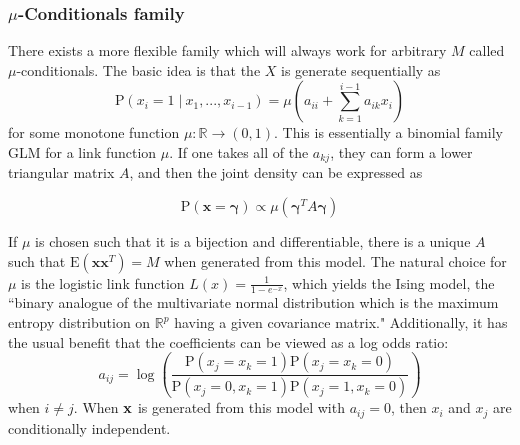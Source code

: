 \documentclass[11pt]{article}
\newcommand{\R}{\mathbb{R}}
\newcommand{\p}{\mathrm{P}}
\newcommand{\E}{\mathrm{E}}
\newcommand{\st}{ \; \big | \:}
\theoremstyle{definition}
\begin{document}
\subsubsection{$\mu$-Conditionals family}
    There exists a more flexible family which will always work for arbitrary $M$ called $\mu$-conditionals. The basic idea is that the $X$ is generate sequentially as 
    \[ \p(x_{i}=1\st x_{1},...,x_{i-1}) = \mu\left(a_{ii}+\sum_{k=1}^{i-1}a_{ik}x_i\right) \]
    for some monotone function $\mu:\R\to(0,1)$. This is essentially a binomial family GLM for a link function $\mu$. If one takes all of the $a_{kj}$, they can form a lower triangular matrix $A$, and then the joint density can be expressed as 

    \[ \p(\mathbf x=\mathbf \gamma) \propto \mu(\mathbf{\gamma}^T A\mathbf \gamma)\]

    If $\mu$ is chosen such that it is a bijection and differentiable, there is a unique $A$ such that $\E(\mathbf x \mathbf x^T)=M$ when generated from this model. The natural choice for $\mu$ is the logistic link function $L(x)=\frac{1}{1-e^{-x}}$, which yields the Ising model, the ``binary analogue of the multivariate normal distribution which is the maximum entropy distribution on $\R^p$ having a given covariance matrix." Additionally, it has the usual benefit that the coefficients can be viewed as a log odds ratio:
    \[a_{ij} = \log\left(\frac{\p(x_j=x_k=1)\p(x_j=x_k=0)}{\p(x_j=0,x_k=1)\p(x_j=1,x_k=0)}\right) \]
    when $i\neq j$. When $\bf x$ is generated from this model with $a_{ij}=0$, then $x_i$ and $x_j$ are conditionally independent.  \par
\end{document}
